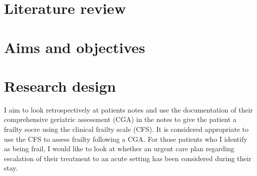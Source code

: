 \documentclass[12pt,a4paper,oneside,titlepage]{article}
\begin{document}
\section*{Literature review}
\section*{Aims and objectives}
\section*{Research design}

I aim to look retrospectively at patients notes and use the documentation of their comprehensive geriatric assessment (CGA) in the notes to give the patient a frailty socre using the clinical frailty scale (CFS). It is considered appropriate to use the CFS to assess frailty following a CGA. 
For those patients who I identify as being frail, I would like to look at whether an urgent care plan regarding escalation of their treatment to an acute setting has been considered during their stay.

\clearpage
\printbibliography[prenote=needsfixing]
\end{document}
